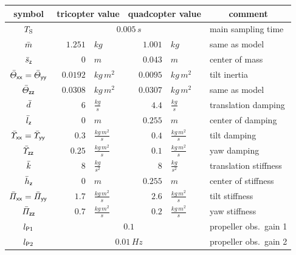 \begin{table}
 \centering
 \setlength{\tabcolsep}{.1em}
 \begin{tabular}{crlrll}
  \toprule
  \phantom{|} \quad symbol \quad\phantom{|} & \multicolumn{2}{c}{\phantom{|} \quad tricopter value \quad\phantom{|} } & \multicolumn{2}{c}{\phantom{|} \quad quadcopter value \quad\phantom{|}} & \multicolumn{1}{c}{\phantom{|} \qquad comment \qquad\phantom{|}} \\
  \midrule
  $T_{\mathrm{S}}$  & \multicolumn{4}{c}{$0.005\,\unit{s}$} & main sampling time \\
  \midrule
  $\quad\bar{m}\quad$ & \phantom{|} \qquad$1.251$&$\unit{kg}$ & \phantom{|} \qquad$1.001$&$\unit{kg}$ & same as model \\
  $\bar{s}_{\mathsf{z}}$ & $ 0 $&$\unit{m}$ & $ 0.043$&$\unit{m}$ & center of mass \\
  $\bar{\varTheta}_{\mathsf{x}\mathsf{x}}=\bar{\varTheta}_{\mathsf{y}\mathsf{y}}$ & $0.0192$&$\unit{kg}\,\unit{m}^2$& $0.0095$&$\unit{kg}\,\unit{m}^2$ & tilt inertia \\
  $\bar{\varTheta}_{\mathsf{z}\mathsf{z}}$ & $0.0308$&$\unit{kg}\,\unit{m}^2$ & $0.0307$&$\unit{kg}\,\unit{m}^2$ & same as model 
  \\[.3ex]
  $\quad\bar{d}\quad$ & $6$&$\tfrac{\unit{kg}}{\unit{s}}$ & $4.4$&$\tfrac{\unit{kg}}{\unit{s}}$ & translation damping \\
  $\bar{l}_{\mathsf{z}}$ & $ 0 $&$\unit{m}$ & $ 0.255$&$\unit{m}$ & center of damping \\
  $\bar{\varUpsilon}_{\mathsf{x}\mathsf{x}}=\bar{\varUpsilon}_{\mathsf{y}\mathsf{y}}$ & $0.3$&$\tfrac{\unit{kg}\,\unit{m}^2}{\unit{s}}$& $0.4$&$\tfrac{\unit{kg}\,\unit{m}^2}{\unit{s}}$ & tilt damping \\
  $\bar{\varUpsilon}_{\mathsf{z}\mathsf{z}}$ & $0.25$&$\tfrac{\unit{kg}\,\unit{m}^2}{\unit{s}}$ & $0.1$&$\tfrac{\unit{kg}\,\unit{m}^2}{\unit{s}}$ & yaw damping
  \\[.3ex]
  $\quad\bar{k}\quad$ & $8$&$\tfrac{\unit{kg}}{\unit{s}^2}$ & $8$&$\tfrac{\unit{kg}}{\unit{s}^2}$ & translation stiffness \\
  $\bar{h}_{\mathsf{z}}$ & $ 0 $&$\unit{m}$ & $ 0.255$&$\unit{m}$ & center of stiffness \\
  $\bar{\varPi}_{\mathsf{x}\mathsf{x}}=\bar{\varPi}_{\mathsf{y}\mathsf{y}}$ & $1.7$&$\tfrac{\unit{kg}\,\unit{m}^2}{\unit{s}}$& $2.6$&$\tfrac{\unit{kg}\,\unit{m}^2}{\unit{s}}$ & tilt stiffness \\
  $\bar{\varPi}_{\mathsf{z}\mathsf{z}}$ & $0.7$&$\tfrac{\unit{kg}\,\unit{m}^2}{\unit{s}}$ & $0.2$&$\tfrac{\unit{kg}\,\unit{m}^2}{\unit{s}}$ & yaw stiffness \\
  \midrule
  $l_{\mathsf{P}1}$  & \multicolumn{4}{c}{$0.1$} & propeller obs.\ gain 1 \\
  $l_{\mathsf{P}2}$  & \multicolumn{4}{c}{$0.01\,\unit{Hz}$} & propeller obs.\ gain 2 \\

\end{tabular}
\end{table}
